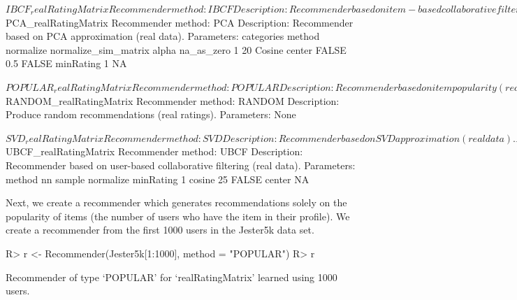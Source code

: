 \documentclass[nojss]{jss}
\begin{document}
\begin{Schunk}
\begin{Soutput}
$IBCF_realRatingMatrix
Recommender method: IBCF
Description: Recommender based on item-based collaborative filtering (real data).
Parameters:
   k method normalize normalize_sim_matrix alpha na_as_zero minRating
1 30 Cosine    center                FALSE   0.5      FALSE        NA

$PCA_realRatingMatrix
Recommender method: PCA
Description: Recommender based on PCA approximation (real data).
Parameters:
  categories method normalize normalize_sim_matrix alpha na_as_zero
1         20 Cosine    center                FALSE   0.5      FALSE
  minRating
1        NA

$POPULAR_realRatingMatrix
Recommender method: POPULAR
Description: Recommender based on item popularity (real data).
Parameters: None

$RANDOM_realRatingMatrix
Recommender method: RANDOM
Description: Produce random recommendations (real ratings).
Parameters: None

$SVD_realRatingMatrix
Recommender method: SVD
Description: Recommender based on SVD approximation (real data).
Parameters:
  categories method normalize normalize_sim_matrix alpha treat_na
1         50 Cosine    center                FALSE   0.5   median
  minRating
1        NA

$UBCF_realRatingMatrix
Recommender method: UBCF
Description: Recommender based on user-based collaborative filtering (real data).
Parameters:
  method nn sample normalize minRating
1 cosine 25  FALSE    center        NA
\end{Soutput}
\end{Schunk}

Next, we create a recommender which generates recommendations 
solely on the popularity of items (the number of users who have the item in
their profile). We create a recommender 
from the first 1000 users in the Jester5k data set.

\begin{Schunk}
\begin{Sinput}
R> r <- Recommender(Jester5k[1:1000], method = "POPULAR")
R> r
\end{Sinput}
\begin{Soutput}
Recommender of type ‘POPULAR’ for ‘realRatingMatrix’ 
learned using 1000 users.
\end{Soutput}
\end{Schunk}
\end{document}
